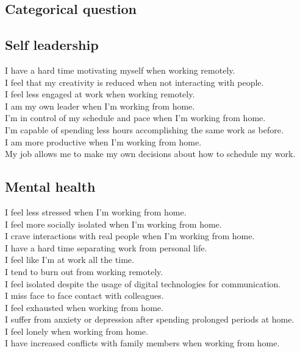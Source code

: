 \documentclass[12pt]{article}
\begin{document}
\subsection*{Categorical question}
\subsection*{Self leadership}

I have a hard time motivating myself when working remotely. \\
I feel that my creativity is reduced when not interacting with people. \\
I feel less engaged at work when working remotely. \\
I am my own leader when I’m working from home. \\
I’m in control of my schedule and pace when I'm working from home. \\
I’m capable of spending less hours accomplishing the same work as before. \\
I am more productive when I’m working from home.  \\
My job allows me to make my own decisions about how to schedule my work.

\subsection*{Mental health}

I feel less stressed when I’m working from home. \\
I feel more socially isolated when I’m working from home. \\
I crave interactions with real people when I’m working from home. \\
I have a hard time separating work from personal life. \\
I feel like I'm at work all the time.  \\
I tend to burn out from working remotely. \\
I feel isolated despite the usage of digital technologies for communication. \\
I miss face to face contact with colleagues. \\
I feel exhausted when working from home. \\
I suffer from anxiety or depression after spending prolonged periods at home. \\
I feel lonely when working from home. \\
I have increased conflicts with family members when working from home. 
\end{document}
